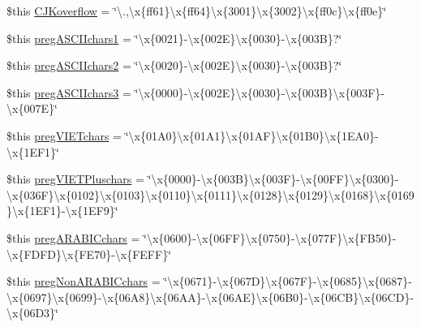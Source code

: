 \begin{DoxyCompactItemize}
\$this \hyperlink{config_8php_af2812cfa35e655533418dd64883a9746}{C\-J\-Koverflow} = \char`\"{}\textbackslash{}.,\textbackslash{}x\{ff61\}\textbackslash{}x\{ff64\}\textbackslash{}x\{3001\}\textbackslash{}x\{3002\}\textbackslash{}x\{ff0c\}\textbackslash{}x\{ff0e\}\char`\"{}
\item 
\$this \hyperlink{config_8php_a6eacffa92e9788aab5737861b6a68ce2}{preg\-A\-S\-C\-I\-Ichars1} = \char`\"{}\textbackslash{}x\{0021\}-\/\textbackslash{}x\{002\-E\}\textbackslash{}x\{0030\}-\/\textbackslash{}x\{003\-B\}?\char`\"{}
\item 
\$this \hyperlink{config_8php_ad185c919bbe911f2b8d225c1042cb9fd}{preg\-A\-S\-C\-I\-Ichars2} = \char`\"{}\textbackslash{}x\{0020\}-\/\textbackslash{}x\{002\-E\}\textbackslash{}x\{0030\}-\/\textbackslash{}x\{003\-B\}?\char`\"{}
\item 
\$this \hyperlink{config_8php_a182d60f561cc17ad99c502f8dba365b1}{preg\-A\-S\-C\-I\-Ichars3} = \char`\"{}\textbackslash{}x\{0000\}-\/\textbackslash{}x\{002\-E\}\textbackslash{}x\{0030\}-\/\textbackslash{}x\{003\-B\}\textbackslash{}x\{003\-F\}-\/\textbackslash{}x\{007\-E\}\char`\"{}
\item 
\$this \hyperlink{config_8php_abf298b1fd6e2145eed3407854d7de48e}{preg\-V\-I\-E\-Tchars} = \char`\"{}\textbackslash{}x\{01\-A0\}\textbackslash{}x\{01\-A1\}\textbackslash{}x\{01\-A\-F\}\textbackslash{}x\{01\-B0\}\textbackslash{}x\{1\-E\-A0\}-\/\textbackslash{}x\{1\-E\-F1\}\char`\"{}
\item 
\$this \hyperlink{config_8php_a7ec8c8e00ca6c33fbbcc0a501b985425}{preg\-V\-I\-E\-T\-Pluschars} = \char`\"{}\textbackslash{}x\{0000\}-\/\textbackslash{}x\{003\-B\}\textbackslash{}x\{003\-F\}-\/\textbackslash{}x\{00\-F\-F\}\textbackslash{}x\{0300\}-\/\textbackslash{}x\{036\-F\}\textbackslash{}x\{0102\}\textbackslash{}x\{0103\}\textbackslash{}x\{0110\}\textbackslash{}x\{0111\}\textbackslash{}x\{0128\}\textbackslash{}x\{0129\}\textbackslash{}x\{0168\}\textbackslash{}x\{0169\}\textbackslash{}x\{1\-E\-F1\}-\/\textbackslash{}x\{1\-E\-F9\}\char`\"{}
\item 
\$this \hyperlink{config_8php_affc7d9af6591527aaf7f6b2031ff3bb9}{preg\-A\-R\-A\-B\-I\-Cchars} = \char`\"{}\textbackslash{}x\{0600\}-\/\textbackslash{}x\{06\-F\-F\}\textbackslash{}x\{0750\}-\/\textbackslash{}x\{077\-F\}\textbackslash{}x\{\-F\-B50\}-\/\textbackslash{}x\{\-F\-D\-F\-D\}\textbackslash{}x\{\-F\-E70\}-\/\textbackslash{}x\{\-F\-E\-F\-F\}\char`\"{}
\item 
\$this \hyperlink{config_8php_a15a49b16432aeaf91fc29d004238a6fd}{preg\-Non\-A\-R\-A\-B\-I\-Cchars} = \char`\"{}\textbackslash{}x\{0671\}-\/\textbackslash{}x\{067\-D\}\textbackslash{}x\{067\-F\}-\/\textbackslash{}x\{0685\}\textbackslash{}x\{0687\}-\/\textbackslash{}x\{0697\}\textbackslash{}x\{0699\}-\/\textbackslash{}x\{06\-A8\}\textbackslash{}x\{06\-A\-A\}-\/\textbackslash{}x\{06\-A\-E\}\textbackslash{}x\{06\-B0\}-\/\textbackslash{}x\{06\-C\-B\}\textbackslash{}x\{06\-C\-D\}-\/\textbackslash{}x\{06\-D3\}\char`\"{}

\end{DoxyCompactItemize}
